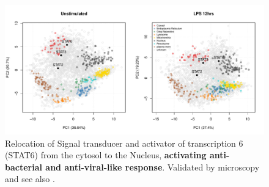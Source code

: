 \begin{frame}
  \begin{figure}[h]
    \centering
    \includegraphics[width=\linewidth]{./figs_local/lps-stat.pdf}
    \caption{Relocation of Signal transducer and activator of
      transcription 6 (STAT6) from the cytosol to the Nucleus,
      \textbf{activating anti-bacterial and anti-viral-like
        response}. Validated by microscopy and see also
      \cite{Chen:2011}.}
  \end{figure}
\end{frame}
